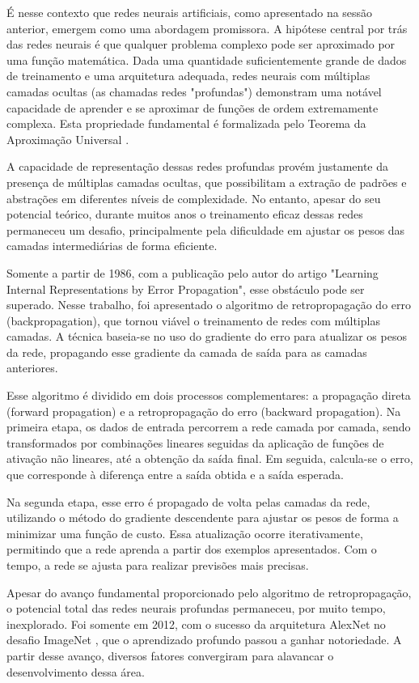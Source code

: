 É nesse contexto que redes neurais artificiais, como apresentado na sessão anterior, emergem como uma abordagem promissora. A hipótese central por trás das redes neurais é que qualquer problema complexo pode ser aproximado por uma função matemática. Dada uma quantidade suficientemente grande de dados de treinamento e uma arquitetura adequada, redes neurais com múltiplas camadas ocultas (as chamadas redes "profundas") demonstram uma notável capacidade de aprender e se aproximar de funções de ordem extremamente complexa. Esta propriedade fundamental é formalizada pelo Teorema da Aproximação Universal \cite{hornik_multilayer_1989}.

A capacidade de representação dessas redes profundas provém justamente da presença de múltiplas camadas ocultas, que possibilitam a extração de padrões e abstrações em diferentes níveis de complexidade. No entanto, apesar do seu potencial teórico, durante muitos anos o treinamento eficaz dessas redes permaneceu um desafio, principalmente pela dificuldade em ajustar os pesos das camadas intermediárias de forma eficiente.

Somente a partir de 1986, com a publicação pelo autor  do artigo "Learning Internal Representations by Error Propagation", esse obstáculo pode ser superado. Nesse trabalho, foi apresentado o algoritmo de retropropagação do erro (backpropagation), que tornou viável o treinamento de redes com múltiplas camadas. A técnica baseia-se no uso do gradiente do erro para atualizar os pesos da rede, propagando esse gradiente da camada de saída para as camadas anteriores.

Esse algoritmo é dividido em dois processos complementares: a propagação direta (forward propagation) e a retropropagação do erro (backward propagation). Na primeira etapa, os dados de entrada percorrem a rede camada por camada, sendo transformados por combinações lineares seguidas da aplicação de funções de ativação não lineares, até a obtenção da saída final. Em seguida, calcula-se o erro, que corresponde à diferença entre a saída obtida e a saída esperada.

Na segunda etapa, esse erro é propagado de volta pelas camadas da rede, utilizando o método do gradiente descendente para ajustar os pesos de forma a minimizar uma função de custo. Essa atualização ocorre iterativamente, permitindo que a rede aprenda a partir dos exemplos apresentados. Com o tempo, a rede se ajusta para realizar previsões mais precisas.

Apesar do avanço fundamental proporcionado pelo algoritmo de retropropagação, o potencial total das redes neurais profundas permaneceu, por muito tempo, inexplorado. Foi somente em 2012, com o sucesso da arquitetura AlexNet no desafio ImageNet \cite{krizhevsky_imagenet_2017}, que o aprendizado profundo passou a ganhar notoriedade. A partir desse avanço, diversos fatores convergiram para alavancar o desenvolvimento dessa área.

